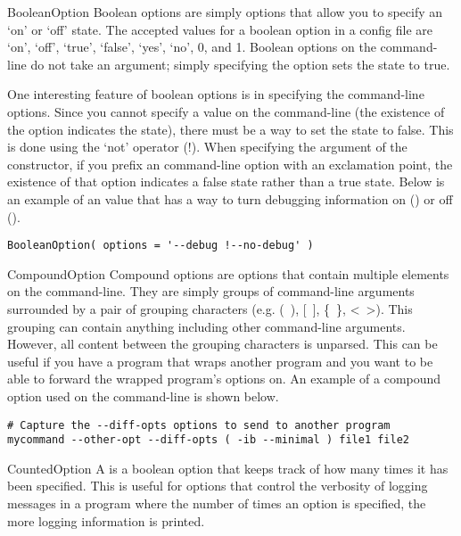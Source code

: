 \begin{classdesc}{BooleanOption}{}
Boolean options are simply options that allow you to specify an `on' or 
`off' state.  The accepted values for a boolean option in a config file
are `on', `off', `true', `false', `yes', `no', 0, and 1.  Boolean options on
the command-line do not take an argument; simply specifying the option
sets the state to true.

One interesting feature of boolean options is in specifying the command-line
options.  Since you cannot specify a value on the command-line (the existence
of the option indicates the state), there must be a way to set the state to
false.  This is done using the `not' operator (!).  When specifying the 
 argument of the constructor, if you prefix an command-line 
option with an exclamation point, the existence of that option indicates
a false state rather than a true state.  Below is an example of an 
value that has a way to turn debugging information on () 
or off ().
\begin{verbatim}
BooleanOption( options = '--debug !--no-debug' )
\end{verbatim}
\end{classdesc}

\begin{classdesc}{CompoundOption}{}
Compound options are options that contain multiple elements on the 
command-line.  They are simply groups of command-line arguments surrounded
by a pair of grouping characters (e.g. (~), [~], \{~\}, <~>).  This grouping
can contain anything including other command-line arguments.  However, 
all content between the grouping characters is unparsed.  This can be useful
if you have a program that wraps another program and you want to be able
to forward the wrapped program's options on.  An example of a compound option
used on the command-line is shown below.
\begin{verbatim}
# Capture the --diff-opts options to send to another program
mycommand --other-opt --diff-opts ( -ib --minimal ) file1 file2
\end{verbatim}
\end{classdesc}

\begin{classdesc}{CountedOption}{}
A  is a boolean option that keeps track of how many
times it has been specified.  This is useful for options that control 
the verbosity of logging messages in a program where the number of times
an option is specified, the more logging information is printed.
\end{classdesc}

